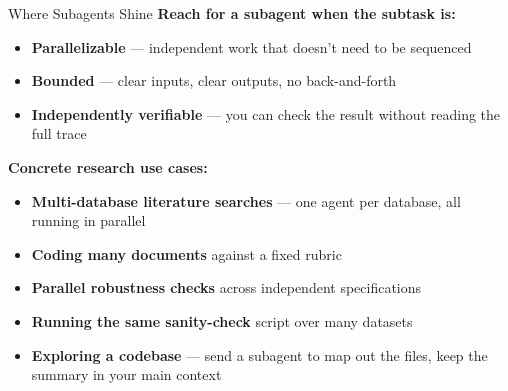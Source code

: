 \documentclass[aspectratio=169, 11pt]{beamer}
\begin{document}
\begin{frame}{Where Subagents Shine}
  \textbf{Reach for a subagent when the subtask is:}
  \begin{itemize}
    \item \textbf{Parallelizable} --- independent work that doesn't need to be sequenced
    \item \textbf{Bounded} --- clear inputs, clear outputs, no back-and-forth
    \item \textbf{Independently verifiable} --- you can check the result without reading the full trace
  \end{itemize}

  \vspace{0.7em}
  \textbf{Concrete research use cases:}
  \begin{itemize}
    \item \textbf{Multi-database literature searches} --- one agent per database, all running in parallel
    \item \textbf{Coding many documents} against a fixed rubric
    \item \textbf{Parallel robustness checks} across independent specifications
    \item \textbf{Running the same sanity-check} script over many datasets
    \item \textbf{Exploring a codebase} --- send a subagent to map out the files, keep the summary in your main context
  \end{itemize}
\end{frame}
\end{document}
